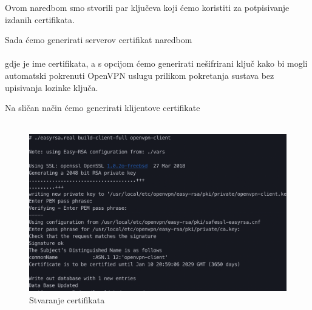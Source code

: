         \noindent
        Ovom naredbom smo stvorili par ključeva koji ćemo koristiti za
        potpisivanje izdanih certifikata. 

        \noindent
        Sada ćemo generirati serverov certifikat naredbom \\

        \noindent
         \\

        \noindent
        gdje je  ime certifikata, a s  opcijom ćemo
        generirati nešifrirani ključ kako bi mogli automatski pokrenuti OpenVPN
        uslugu prilikom pokretanja sustava bez upisivanja lozinke ključa.

        Na sličan način ćemo generirati klijentove certifikate \\

        \noindent
         \\
        
        \begin{figure}[H]
            \centering
            \includegraphics[scale=0.5]{slike/buildClientCert}
            \caption{Stvaranje certifikata}
        \end{figure}

